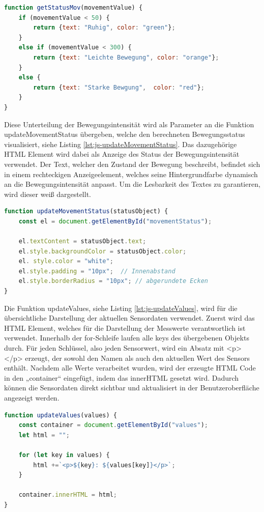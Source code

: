 \begin{lstlisting}[language=JavaScript, caption={Funktion getStatusMov}, label={lst:js-getStatusMov}, firstnumber=108]
function getStatusMov(movementValue) {
    if (movementValue < 50) {
        return {text: "Ruhig", color: "green"};
    }
    else if (movementValue < 300) {
        return {text: "Leichte Bewegung", color: "orange"};
    }
    else {
        return {text: "Starke Bewgung",  color: "red"};
    }
}
\end{lstlisting}

\noindent
Diese Unterteilung der Bewegungsintensität wird als Parameter an die Funktion updateMovementStatus übergeben, 
welche den berechneten Bewegungsstatus visualisiert, siehe Listing \ref{lst:js-updateMovementStatus}. Das dazugehörige HTML Element wird dabei als Anzeige des Status der Bewegungsintensität verwendet. Der Text, welcher den Zustand der Bewegung beschreibt, befindet sich in einem rechteckigen Anzeigeelement, welches seine Hintergrundfarbe dynamisch an die Bewegungsintensität anpasst. Um die Lesbarkeit des Textes zu garantieren, wird dieser weiß dargestellt.

\begin{lstlisting}[language=JavaScript, caption={Funktion updateMovementStatus}, label={lst:js-updateMovementStatus}, firstnumber=120]
function updateMovementStatus(statusObject) {
    const el = document.getElementById("movementStatus");

    el.textContent = statusObject.text;
    el.style.backgroundColor = statusObject.color;
    el. style.color = "white";
    el.style.padding = "10px";  // Innenabstand
    el.style.borderRadius = "10px"; // abgerundete Ecken
}
\end{lstlisting}

\noindent
Die Funktion updateValues, siehe Listing \ref{lst:js-updateValues}, wird für die übersichtliche Darstellung der aktuellen Sensordaten verwendet. Zuerst wird das HTML Element, welches für die Darstellung der Messwerte verantwortlich ist verwendet. Innerhalb der for-Schleife laufen alle keys des übergebenen Objekts durch. Für jeden Schlüssel, also jeden Sensorwert, wird ein Absatz mit <p> </p> erzeugt, der sowohl den Namen als auch den aktuellen Wert des Sensors enthält. Nachdem alle Werte verarbeitet wurden, wird der erzeugte HTML Code in den „container“ eingefügt, indem das innerHTML gesetzt wird. Dadurch können die Sensordaten direkt sichtbar und aktualisiert in der Benutzeroberfläche angezeigt werden.

\begin{lstlisting}[language=JavaScript, caption={Funktion updateValues}, label={lst:js-updateValues}, firstnumber=131]
function updateValues(values) {
    const container = document.getElementById("values");
    let html = "";

    for (let key in values) {
        html +=`<p>${key}: ${values[key]}</p>`;
    }

    container.innerHTML = html;
}
\end{lstlisting}

